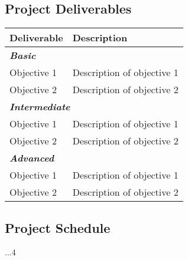 \documentclass[12pt,a4paper]{article}
\begin{document}
\subsection{Project Deliverables}
\begin{tabular}{p{5cm}p{10cm}}
	\hline
	\textbf{Deliverable} & \textbf{Description}\\
	\hline\hline
	\multicolumn{2}{l}{\textit{\textbf{Basic}}} \\
	\hline
	Objective 1   &  Description of objective 1\\
	Objective 2   &  Description of objective 2\\
	\hline \hline
	\multicolumn{2}{l}{\textit{\textbf{Intermediate}}} \\
	\hline
	Objective 1   &  Description of objective 1\\
	Objective 2   &  Description of objective 2\\
	\hline \hline
	\multicolumn{2}{l}{\textit{\textbf{Advanced}}} \\
	\hline
	Objective 1   &  Description of objective 1\\
	Objective 2   &  Description of objective 2\\
	\hline
\end{tabular}

\subsection{Project Schedule}
...4 

\newpage
\end{document}
